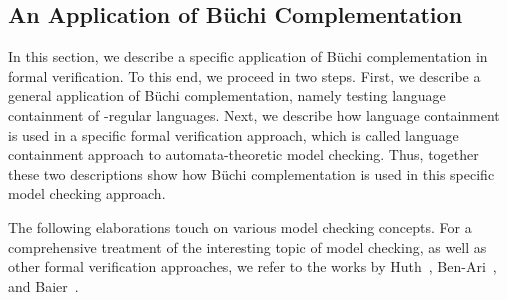 

\subsection{An Application of Büchi Complementation}
\label{1_application}
In this section, we describe a specific application of Büchi complementation in formal verification. To this end, we proceed in two steps. First, we describe a general application of Büchi complementation, namely testing language containment of \om-regular languages. Next, we describe how language containment is used in a specific formal verification approach, which is called language containment approach to automata-theoretic model checking. Thus, together these two descriptions show how Büchi complementation is used in this specific model checking approach.

The following elaborations touch on various model checking concepts. For a comprehensive treatment of the interesting topic of model checking, as well as other formal verification approaches, we refer to the works by Huth~\cite{huth2004logic}, Ben-Ari~\cite{ben2012mathematical}, and Baier~\cite{baier2008principles}.

